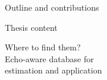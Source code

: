 \begin{frame}{Outline and contributions}
\begin{block}{Thesis content}
    \begin{center}
        \alert{Where to find them?}
        \\Echo-aware database for
        \\estimation and application
    \end{center}
    \end{block}
\end{frame}

